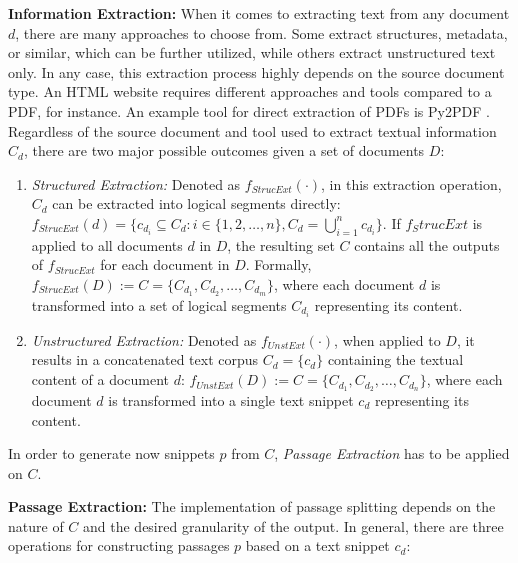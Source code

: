 \vspace{\baselineskip} %

\textbf{Information Extraction:} When it comes to extracting text from any document $d$, there are many approaches to choose from. Some extract structures, metadata, or similar, which can be further utilized, while others extract unstructured text only. In any case, this extraction process highly depends on the source document type. An HTML website requires different approaches and tools compared to a PDF, for instance. An example tool for direct extraction of PDFs is Py2PDF \cite{noauthor_welcome_nodate}. Regardless of the source document and tool used to extract textual information $C_d$, there are two major possible outcomes given a set of documents $D$:

\begin{enumerate}
    \item \textit{Structured Extraction:} Denoted as $f_{StrucExt}(\cdot)$, in this extraction operation, $C_d$ can be extracted into logical segments directly: $f_{StrucExt}(d) = \{c_{d_i} \subseteq C_d : i \in \{1, 2, \ldots, n\}, C_d = \bigcup_{i=1}^{n} c_{d_i}\}$. If $f_StrucExt$ is applied to all documents $d$ in $D$, the resulting set $C$ contains all the outputs of $f_{StrucExt}$ for each document in $D$. Formally, $f_{StrucExt}(D) := C = \{C_{d_1}, C_{d_2}, \dots, C_{d_m}\}$, where each document $d$ is transformed into a set of logical segments $C_{d_i}$ representing its content.
    \item \textit{Unstructured Extraction:} Denoted as $f_{UnstExt}(\cdot)$, when applied to $D$, it results in a concatenated text corpus $C_d = \{c_d\} $ containing the textual content of a document $d$: $f_{UnstExt}(D) := C = \{C_{d_1}, C_{d_2}, \dots, C_{d_n}\}$, where each document $d$ is transformed into a single text snippet $c_d$ representing its content.
\end{enumerate}

In order to generate now snippets $p$ from $C$, \textit{Passage Extraction} has to be applied on $C$.

\vspace{\baselineskip} %

\noindent\textbf{Passage Extraction:} The implementation of passage splitting depends on the nature of $C$ and the desired granularity of the output. In general, there are three operations for constructing passages $p$ based on a text snippet $c_d$:

